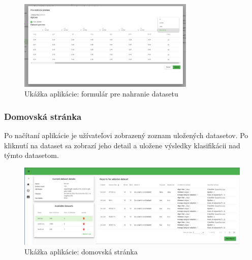 \documentclass[slovak,master,dept460,male,cpp,cpdeclaration]{diploma}
\begin{document}
\begin{figure}[H]
\centering
\includegraphics[width=0.75\textwidth]{upload_dataset.PNG}
\caption{Ukážka aplikácie: formulár pre nahranie datasetu}
\end{figure} 

\subsubsection{Domovská stránka}
Po načítaní aplikácie je užívateľovi zobrazený zoznam uložených datasetov. Po kliknutí na dataset sa zobrazí jeho detail a uložene výsledky klasifikácii nad týmto datasetom.

\begin{figure}[H]
\centering
\includegraphics[width=\textwidth]{dataset_preview.PNG} 
\caption{Ukážka aplikácie: domovská stránka}
\end{figure} 
\end{document}
